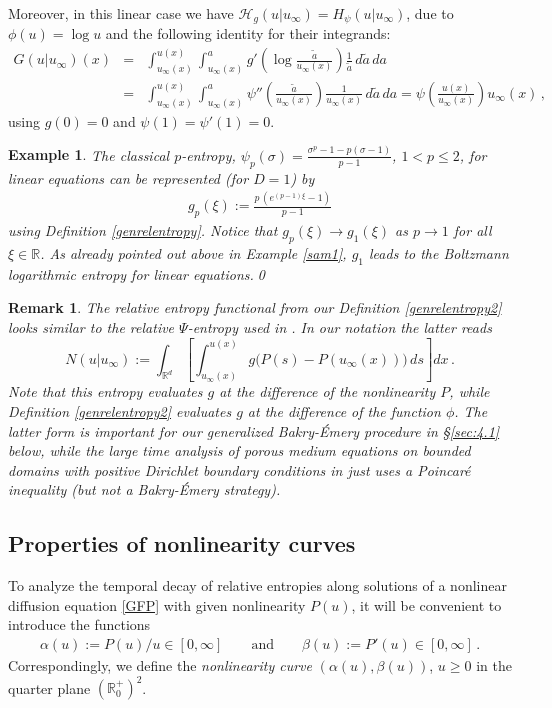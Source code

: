 \documentclass[reqno]{amsart}
\newtheorem{remark}[lemma]{Remark}
\newtheorem{example}[lemma]{Example}
\newcommand{\R}{\mathbb{R}}
\renewcommand{\H}{{\mathcal{H}}}
\begin{document}
Moreover, in this linear case we have $\H_g(u|u_\infty)=H_\psi(u|u_\infty)$, due to $\phi(u)=\log u$ and the following identity for their integrands:
\begin{eqnarray*}
  G(u|u_\infty)(x)&=&\int_{u_\infty(x)}^{u(x)} \int_{u_\infty(x)}^{a} g'\left(\log\frac{\tilde a}{u_\infty(x)}\right) \frac1{\tilde a} \,d\tilde a\,da \\ 
  &=& \int_{u_\infty(x)}^{u(x)}\int_{u_\infty(x)}^{a} \psi''\left(\frac{\tilde a}{u_\infty(x)}\right)  \frac1{u_\infty(x)} \,d\tilde a\,da =
  \psi\left(\frac{u(x)}{u_\infty(x)}\right) u_\infty(x)\,,
\end{eqnarray*}
using $g(0)=0$ and $\psi(1)=\psi'(1)=0$.

\begin{example}
The classical $p$-entropy, $\psi_p(\sigma)=\frac{\sigma^p-1-p(\sigma-1)}{p-1}$, $1<p\leq 2$, for linear equations can be represented (for $D=1$) by
\begin{align}\label{pentropy}
  g_p(\xi):=\frac{p\,\left(e^{(p-1)\xi}-1\right)}{p-1}
\end{align}
using Definition \ref{genrelentropy}.
Notice that $g_p(\xi)\to g_1(\xi)$ as $p\to 1$ for all $\xi\in\R$. As already pointed out above in Example \ref{sam1}, $g_1$ leads to the Boltzmann logarithmic entropy for linear equations.\qed
\end{example}

\begin{remark}\label{rem:ent}
The relative entropy functional from our Definition \ref{genrelentropy2} looks similar to the \emph{relative $\Psi$-entropy} used in \cite{BLMV14}. In our notation the latter reads
$$
  N(u|u_\infty):= \int_{\R^d} \left[ \int_{u_\infty(x)}^{u(x)}g\big(P(s)-P(u_\infty(x))\big)\, ds\right] dx\,.
$$
Note that this entropy evaluates $g$ at the difference of the nonlinearity $P$, while Definition \ref{genrelentropy2} evaluates $g$ at the difference of the function $\phi$. The latter form is important for our generalized Bakry-\'Emery procedure in \S\ref{sec:4.1} below, while the large time analysis of porous medium equations on bounded domains with positive Dirichlet boundary conditions in \cite{BLMV14} just uses a Poincar\'e inequality (but not a Bakry-\'Emery strategy).
\end{remark}


\subsection{Properties of nonlinearity curves}\label{sec:5.1}
To analyze the temporal decay of relative entropies along solutions of %
a nonlinear diffusion equation \eqref{GFP} with given nonlinearity $P(u)$, it will be convenient to introduce the functions
\begin{align}
    \label{eq:P2ab}
  \alpha(u):=P(u)/u \in[0,\infty] \qquad \text{and} \qquad \beta(u):=P'(u) \in[0,\infty] \,.     
\end{align}
Correspondingly, we define the \emph{nonlinearity curve} $(\alpha(u), \beta(u))$, $u \ge 0$ in the quarter plane $(\R^+_0)^2$.
\end{document}
